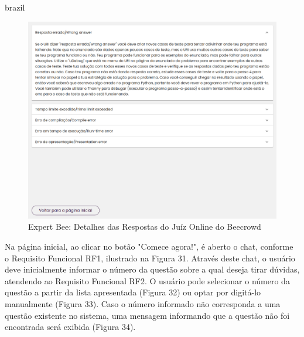 \begin{otherlanguage*}{brazil}
\begin{figure}[H]
    \centering
            \caption{Expert Bee: Detalhes das Respostas do Juíz Online do Beecrowd}
            \label{fig:ModeloConceitual}
        \includegraphics[scale=0.41]{pictures/desenvolvimento/expert_bee_detalhes_respostas.png}
\end{figure}

Na página inicial, ao clicar no botão "Comece agora!", é aberto o chat, conforme o Requisito Funcional RF1, ilustrado na Figura 31. Através deste chat, o usuário deve inicialmente informar o número da questão sobre a qual deseja tirar dúvidas, atendendo ao Requisito Funcional RF2. O usuário pode selecionar o número da questão a partir da lista apresentada (Figura 32) ou optar por digitá-lo manualmente (Figura 33). Caso o número informado não corresponda a uma questão existente no sistema, uma mensagem informando que a questão não foi encontrada será exibida (Figura 34).


\end{otherlanguage*}
